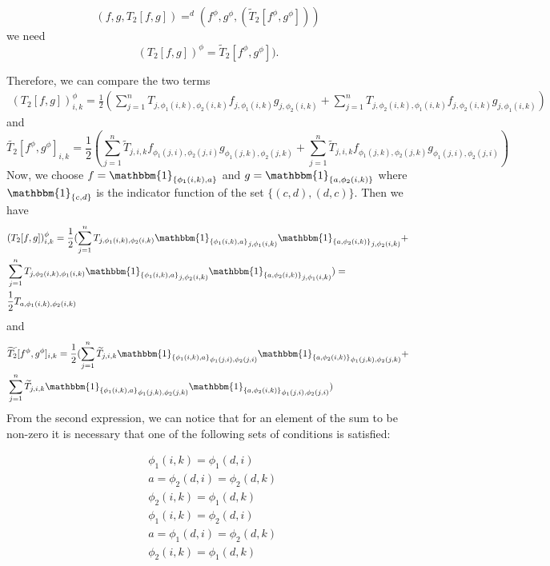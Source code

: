 \documentclass[11pt]{article}
\begin{document}
$$
(f,g, T_2[f,g])=^d (f^{\phi},g^{\phi},  (\widetilde{T}_2[f^{\phi},g^{\phi}]))
$$
we need 
$$(T_2[f,g])^{\phi}=\widetilde{T}_2[f^{\phi},g^{\phi}]).$$

Therefore, we can compare the two terms
$$
\begin{aligned}
(T_2[f,g])_{i,k}^{\phi}=\frac{1}{2}(\sum^n_{j=1}T_{j,\phi_1(i,k),\phi_2(i,k)}f_{j,\phi_1(i,k)}g_{j,\phi_2(i,k)} +\sum^n_{j=1}T_{j,\phi_2(i,k),\phi_1(i,k)}f_{j,\phi_2(i,k)}g_{j,\phi_1(i,k)})
\end{aligned}
$$and
$$
\widetilde{T_2}[f^{\phi},g^{\phi}]_{i,k}=\frac{1}{2}(\sum^n_{j=1}\widetilde{T}_{j,i,k}f_{\phi_1(j,i),\phi_2(j,i)}g_{\phi_1(j,k),\phi_2(j,k)} +\sum^n_{j=1}\widetilde{T}_{j,i,k}f_{\phi_1(j,k),\phi_2(j,k)}g_{\phi_1(j,i),\phi_2(j,i)})
$$
Now, we choose $f=\mathbbm{1}_{\{\phi_1(i,k),a\}}$ and $g=\mathbbm{1}_{\{a,\phi_2(i,k)\}}$ where $\mathbbm{1}_{\{c,d\}}$ is the indicator function of the set $\{(c,d),(d,c)\}$. Then we have 
$$
\begin{aligned}
&(T_2[f,g])_{i,k}^{\phi}=\frac{1}{2}(\sum^n_{j=1}T_{j,\phi_1(i,k),\phi_2(i,k)}{\mathbbm{1}_{\{\phi_1(i,k),a\}}}_{j,\phi_1(i,k)}{\mathbbm{1}_{\{a,\phi_2(i,k)\}}}_{j,\phi_2(i,k)} +\\
&\sum^n_{j=1}T_{j,\phi_2(i,k),\phi_1(i,k)}{\mathbbm{1}_{\{\phi_1(i,k),a\}}}_{j,\phi_2(i,k)}{\mathbbm{1}_{\{a,\phi_2(i,k)\}}}_{j,\phi_1(i,k)})=\\
&\frac{1}{2}T_{a,\phi_1(i,k),\phi_2(i,k)}
\end{aligned}
$$and
\begin{equation*}
\begin{aligned}
&\widetilde{T_2}[f^{\phi},g^{\phi}]_{i,k}=\frac{1}{2}(\sum^n_{j=1}\widetilde{T}_{j,i,k}{\mathbbm{1}_{\{\phi_1(i,k),a\}}}_{\phi_1(j,i),\phi_2(j,i)}{\mathbbm{1}_{\{a,\phi_2(i,k)\}}}_{\phi_1(j,k),\phi_2(j,k)} + \\ &\sum^n_{j=1}\widetilde{T}_{j,i,k}{\mathbbm{1}_{\{\phi_1(i,k),a\}}}_{\phi_1(j,k),\phi_2(j,k)}{\mathbbm{1}_{\{a,\phi_2(i,k)\}}}_{\phi_1(j,i),\phi_2(j,i)})
\end{aligned}
\end{equation*}
From the second expression, we can notice that for an element of the sum to be non-zero it is necessary that one of the following sets of conditions is satisfied:

\begin{equation}\label{eqn:Cond1nonzero}
\begin{aligned}
&\phi_1(i,k)=\phi_1(d,i)\\
&a=\phi_2(d,i)=\phi_2(d,k)\\
&\phi_2(i,k)=\phi_1(d,k)
\end{aligned}
\end{equation}
\begin{equation}\label{eqn:Cond2nonzero}
\begin{aligned}
&\phi_1(i,k)=\phi_2(d,i)\\
&a=\phi_1(d,i)=\phi_2(d,k)\\
&\phi_2(i,k)=\phi_1(d,k)
\end{aligned}
\end{equation}
\end{document}
